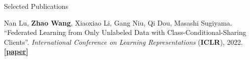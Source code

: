 \documentclass[a4paper]{resume} %
\begin{document}
\begin{rSection}{Selected Publications}
\begin{enumerate}[label={[\arabic*]}, topsep=0em, leftmargin=1.4em, itemsep=-0.5em]
\item Nan Lu, {\bf Zhao Wang}, Xiaoxiao Li, Gang Niu, Qi Dou, Masashi Sugiyama. “Federated Learning from Only Unlabeled Data with Class-Conditional-Sharing Clients”. {\it International Conference on Learning Representations} ({\bf ICLR}), 2022. \href{https://openreview.net/forum?id=WHA8009laxu}{\bf [paper]}





\end{enumerate}








\end{rSection}
\end{document}
